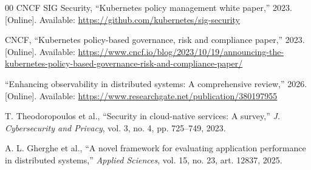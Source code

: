 \documentclass[conference]{IEEEtran}
\begin{document}
\begin{thebibliography}{00}
CNCF SIG Security, ``Kubernetes policy management white paper,'' 2023. [Online]. Available: \url{https://github.com/kubernetes/sig-security}

CNCF, ``Kubernetes policy-based governance, risk and compliance paper,'' 2023. [Online]. Available: \url{https://www.cncf.io/blog/2023/10/19/announcing-the-kubernetes-policy-based-governance-risk-and-compliance-paper/}

``Enhancing observability in distributed systems: A comprehensive review,'' 2026. [Online]. Available: \url{https://www.researchgate.net/publication/380197955}

T. Theodoropoulos et al., ``Security in cloud-native services: A survey,'' \textit{J. Cybersecurity and Privacy}, vol. 3, no. 4, pp. 725--749, 2023.

A. L. Gherghe et al., ``A novel framework for evaluating application performance in distributed systems,'' \textit{Applied Sciences}, vol. 15, no. 23, art. 12837, 2025.

\end{thebibliography}
\end{document}
